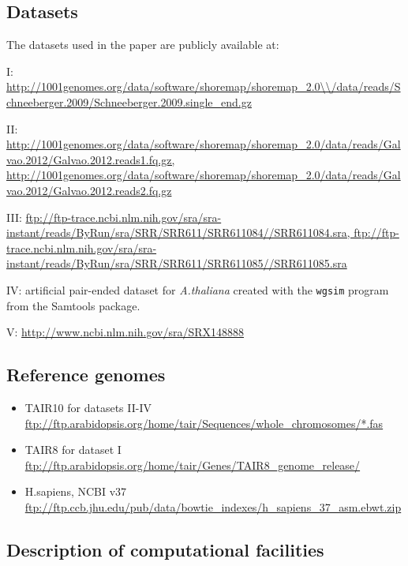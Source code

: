 \documentclass[10pt]{article}
\begin{document}
\subsection*{Datasets}

The datasets used in the paper are publicly available at:

I: \url{http://1001genomes.org/data/software/shoremap/shoremap\_2.0\\/data/reads/Schneeberger.2009/Schneeberger.2009.single\_end.gz}

II: \url{http://1001genomes.org/data/software/shoremap/shoremap\_2.0/data/reads/Galvao.2012/Galvao.2012.reads1.fq.gz, http://1001genomes.org/data/software/shoremap/shoremap\_2.0/data/reads/Galvao.2012/Galvao.2012.reads2.fq.gz}	

III: \url{ftp://ftp-trace.ncbi.nlm.nih.gov/sra/sra-instant/reads/ByRun/sra/SRR/SRR611/SRR611084//SRR611084.sra, ftp://ftp-trace.ncbi.nlm.nih.gov/sra/sra-instant/reads/ByRun/sra/SRR/SRR611/SRR611085//SRR611085.sra}

IV: artificial pair-ended dataset for {\it A.thaliana} created with the {\tt wgsim} program from the Samtools package.

V: \url{http://www.ncbi.nlm.nih.gov/sra/SRX148888}


\subsection*{Reference genomes}
\begin{itemize}
\item TAIR10 for datasets II-IV \url{ftp://ftp.arabidopsis.org/home/tair/Sequences/whole\_chromosomes/*.fas}
\item TAIR8 for dataset I \url{ftp://ftp.arabidopsis.org/home/tair/Genes/TAIR8\_genome\_release/}
\item H.sapiens, NCBI v37 \url{ftp://ftp.ccb.jhu.edu/pub/data/bowtie\_indexes/h\_sapiens\_37\_asm.ebwt.zip}
\end{itemize}

\subsection*{Description of computational facilities}
\end{document}
